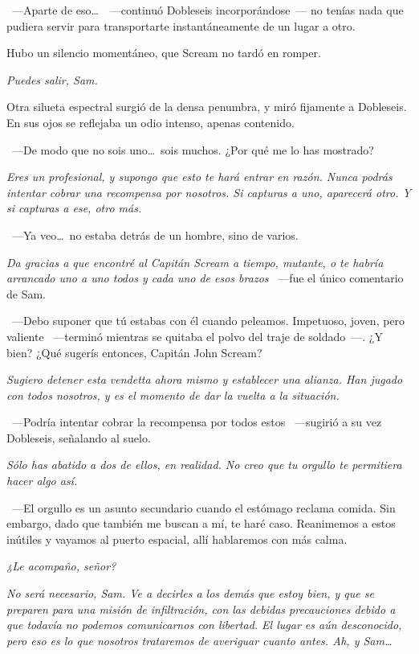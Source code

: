 ~---Aparte de eso\dots\ ~---continuó Dobleseis incorporándose~--- no tenías nada que pudiera servir para transportarte instantáneamente de un lugar a otro.

Hubo un silencio momentáneo, que Scream no tardó en romper.

\emph{Puedes salir, Sam.}

Otra silueta espectral surgió de la densa penumbra, y miró fijamente a Dobleseis. En sus ojos se reflejaba un odio intenso, apenas contenido.

~---De modo que no sois uno\dots\ sois muchos. ¿Por qué me lo has mostrado?

\emph{Eres un profesional, y supongo que esto te hará entrar en razón. Nunca podrás intentar cobrar una recompensa por nosotros. Si capturas a uno, aparecerá otro. Y si capturas a ese, otro más.}

~---Ya veo\dots\ no estaba detrás de un hombre, sino de varios.

\emph{Da gracias a que encontré al Capitán Scream a tiempo, mutante, o te habría arrancado uno a uno todos y cada uno de esos brazos} ~---fue el único comentario de Sam.

~---Debo suponer que tú estabas con él cuando peleamos. Impetuoso, joven, pero valiente ~---terminó mientras se quitaba el polvo del traje de soldado~---. ¿Y bien? ¿Qué sugerís entonces, Capitán John Scream?

\emph{Sugiero detener esta vendetta ahora mismo y establecer una alianza. Han jugado con todos nosotros, y es el momento de dar la vuelta a la situación.}

~---Podría intentar cobrar la recompensa por todos estos ~---sugirió a su vez Dobleseis, señalando al suelo.

\emph{Sólo has abatido a dos de ellos, en realidad. No creo que tu orgullo te permitiera hacer algo así.}

~---El orgullo es un asunto secundario cuando el estómago reclama comida. Sin embargo, dado que también me buscan a mí, te haré caso. Reanimemos a estos inútiles y vayamos al puerto espacial, allí hablaremos con más calma.

\emph{¿Le acompaño, señor?}

\emph{No será necesario, Sam. Ve a decirles a los demás que estoy bien, y que se preparen para una misión de infiltración, con las debidas precauciones debido a que todavía no podemos comunicarnos con libertad. El lugar es aún desconocido, pero eso es lo que nosotros trataremos de averiguar cuanto antes. Ah, y Sam\dots}

